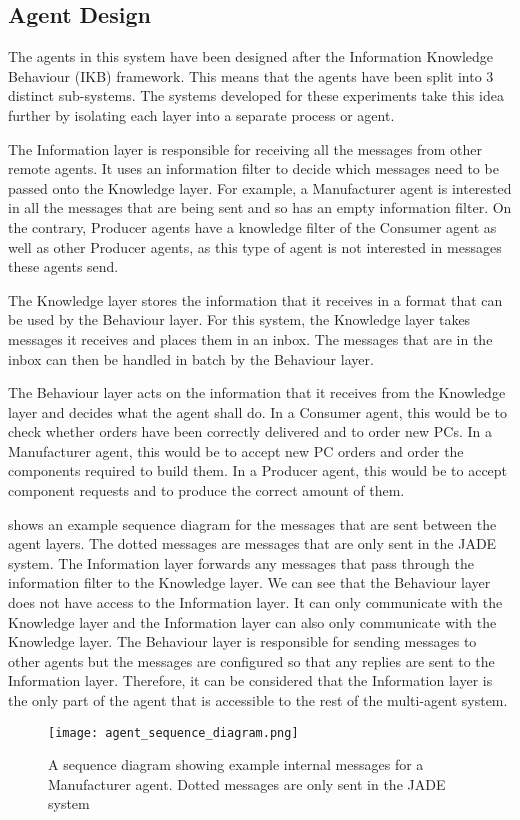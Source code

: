 \subsection{Agent Design}

The agents in this system have been designed after the Information Knowledge Behaviour (IKB) framework.
This means that the agents have been split into 3 distinct sub-systems.
The systems developed for these experiments take this idea further by isolating each layer into a separate process or agent.

The Information layer is responsible for receiving all the messages from other remote agents.
It uses an information filter to decide which messages need to be passed onto the Knowledge layer.
For example, a Manufacturer agent is interested in all the messages that are being sent and so has an empty information filter.
On the contrary, Producer agents have a knowledge filter of the Consumer agent as well as other Producer agents, as this type of agent is not interested in messages these agents send.

The Knowledge layer stores the information that it receives in a format that can be used by the Behaviour layer.
For this system, the Knowledge layer takes messages it receives and places them in an inbox.
The messages that are in the inbox can then be handled in batch by the Behaviour layer.

The Behaviour layer acts on the information that it receives from the Knowledge layer and decides what the agent shall do.
In a Consumer agent, this would be to check whether orders have been correctly delivered and to order new PCs.
In a Manufacturer agent, this would be to accept new PC orders and order the components required to build them.
In a Producer agent, this would be to accept component requests and to produce the correct amount of them.

 shows an example sequence diagram for the messages that are sent between the agent layers.
The dotted messages are messages that are only sent in the JADE system.
The Information layer forwards any messages that pass through the information filter to the Knowledge layer.
We can see that the Behaviour layer does not have access to the Information layer.
It can only communicate with the Knowledge layer and the Information layer can also only communicate with the Knowledge layer.
The Behaviour layer is responsible for sending messages to other agents but the messages are configured so that any replies are sent to the Information layer.
Therefore, it can be considered that the Information layer is the only part of the agent that is accessible to the rest of the multi-agent system.

\begin{figure}[h]
    \centering
    \texttt{[image: agent\_sequence\_diagram.png]}
    \caption{A sequence diagram showing example internal messages for a Manufacturer agent. Dotted messages are only sent in the JADE system}\label{fig:agent_sequence_diagram}
\end{figure}
